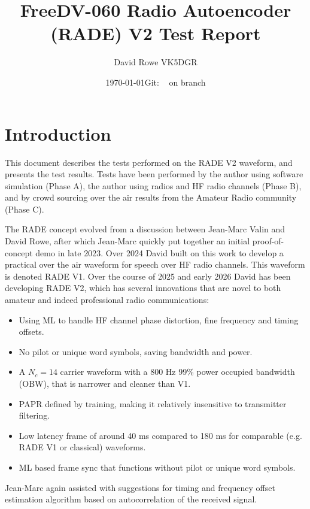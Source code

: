 \documentclass{article}
\newcommand{\commit}{\dots~(in \emph{packed-refs})}}
\newcommand{\gitrevision}{%
  \StrLeft{\commit}{7}%
}
\begin{document}


\title{FreeDV-060 Radio Autoencoder (RADE) V2 Test Report}
\author{David Rowe VK5DGR}
\date{\today \quad Git: \texttt{\gitrevision} on branch \texttt{\branch}\\}
\maketitle

\section{Introduction}

This document describes the tests performed on the RADE V2 waveform, and presents the test results.  Tests have been performed by the author using software simulation (Phase A), the author using radios and HF radio channels (Phase B), and by crowd sourcing over the air results from the Amateur Radio community (Phase C).

The RADE concept evolved from a discussion between Jean-Marc Valin and David Rowe, after which Jean-Marc quickly put together an initial proof-of-concept demo in late 2023. Over 2024 David built on this work to develop a practical over the air waveform for speech over HF radio channels. This waveform is denoted RADE V1. 
Over the course of 2025 and early 2026 David has been developing RADE V2, which has several innovations that are novel to both amateur and indeed professional radio communications:
\begin{itemize}
\item Using ML to handle HF channel phase distortion, fine frequency and timing offsets.
\item No pilot or unique word symbols, saving bandwidth and power.
\item A $N_c=14$ carrier waveform with a 800 \si{Hz} 99\% power occupied bandwidth (OBW), that is narrower and cleaner than V1.
\item PAPR defined by training, making it relatively insensitive to transmitter filtering.
\item Low latency frame of around 40 \si{ms} compared to 180 \si{ms} for comparable (e.g. RADE V1 or classical) waveforms.
\item ML based frame sync that functions without pilot or unique word symbols.
\end{itemize}
Jean-Marc again assisted with suggestions for timing and frequency offset estimation algorithm based on autocorrelation of the received signal.
\end{document}

